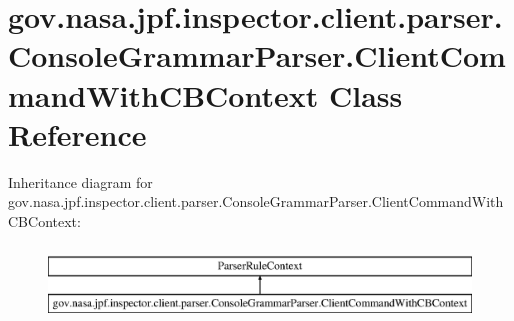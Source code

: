 \hypertarget{classgov_1_1nasa_1_1jpf_1_1inspector_1_1client_1_1parser_1_1_console_grammar_parser_1_1_client_command_with_c_b_context}{}\section{gov.\+nasa.\+jpf.\+inspector.\+client.\+parser.\+Console\+Grammar\+Parser.\+Client\+Command\+With\+C\+B\+Context Class Reference}
\label{classgov_1_1nasa_1_1jpf_1_1inspector_1_1client_1_1parser_1_1_console_grammar_parser_1_1_client_command_with_c_b_context}
Inheritance diagram for gov.\+nasa.\+jpf.\+inspector.\+client.\+parser.\+Console\+Grammar\+Parser.\+Client\+Command\+With\+C\+B\+Context\+:\begin{figure}[H]
\begin{center}
\leavevmode
\includegraphics[height=2.000000cm]{classgov_1_1nasa_1_1jpf_1_1inspector_1_1client_1_1parser_1_1_console_grammar_parser_1_1_client_command_with_c_b_context}
\end{center}
\end{figure}
